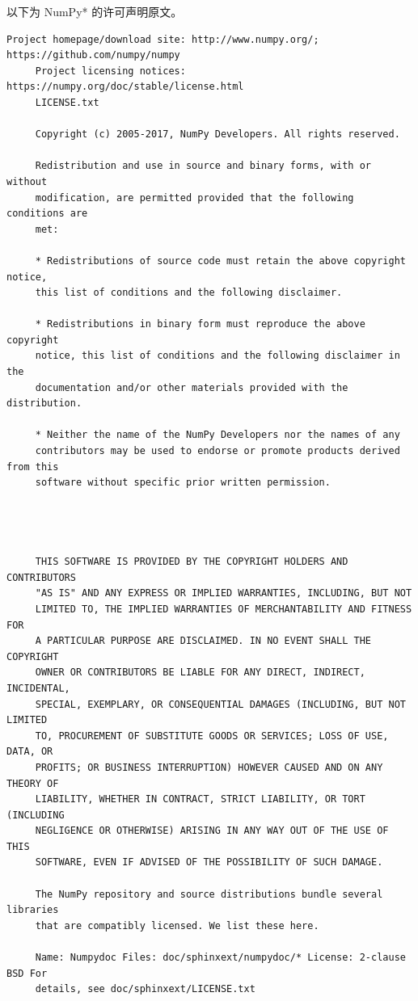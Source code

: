 以下为 NumPy* 的许可声明原文。

\begin{lstlisting}[basicstyle=\ttfamily\footnotesize,breaklines=true]
     Project homepage/download site: http://www.numpy.org/; https://github.com/numpy/numpy
     Project licensing notices: https://numpy.org/doc/stable/license.html
     LICENSE.txt

     Copyright (c) 2005-2017, NumPy Developers. All rights reserved.

     Redistribution and use in source and binary forms, with or without
     modification, are permitted provided that the following conditions are
     met:

     * Redistributions of source code must retain the above copyright notice,
     this list of conditions and the following disclaimer.

     * Redistributions in binary form must reproduce the above copyright
     notice, this list of conditions and the following disclaimer in the
     documentation and/or other materials provided with the distribution.

     * Neither the name of the NumPy Developers nor the names of any
     contributors may be used to endorse or promote products derived from this
     software without specific prior written permission.




     THIS SOFTWARE IS PROVIDED BY THE COPYRIGHT HOLDERS AND CONTRIBUTORS
     "AS IS" AND ANY EXPRESS OR IMPLIED WARRANTIES, INCLUDING, BUT NOT
     LIMITED TO, THE IMPLIED WARRANTIES OF MERCHANTABILITY AND FITNESS FOR
     A PARTICULAR PURPOSE ARE DISCLAIMED. IN NO EVENT SHALL THE COPYRIGHT
     OWNER OR CONTRIBUTORS BE LIABLE FOR ANY DIRECT, INDIRECT, INCIDENTAL,
     SPECIAL, EXEMPLARY, OR CONSEQUENTIAL DAMAGES (INCLUDING, BUT NOT LIMITED
     TO, PROCUREMENT OF SUBSTITUTE GOODS OR SERVICES; LOSS OF USE, DATA, OR
     PROFITS; OR BUSINESS INTERRUPTION) HOWEVER CAUSED AND ON ANY THEORY OF
     LIABILITY, WHETHER IN CONTRACT, STRICT LIABILITY, OR TORT (INCLUDING
     NEGLIGENCE OR OTHERWISE) ARISING IN ANY WAY OUT OF THE USE OF THIS
     SOFTWARE, EVEN IF ADVISED OF THE POSSIBILITY OF SUCH DAMAGE.

     The NumPy repository and source distributions bundle several libraries
     that are compatibly licensed. We list these here.

     Name: Numpydoc Files: doc/sphinxext/numpydoc/* License: 2-clause BSD For
     details, see doc/sphinxext/LICENSE.txt


\end{lstlisting}
